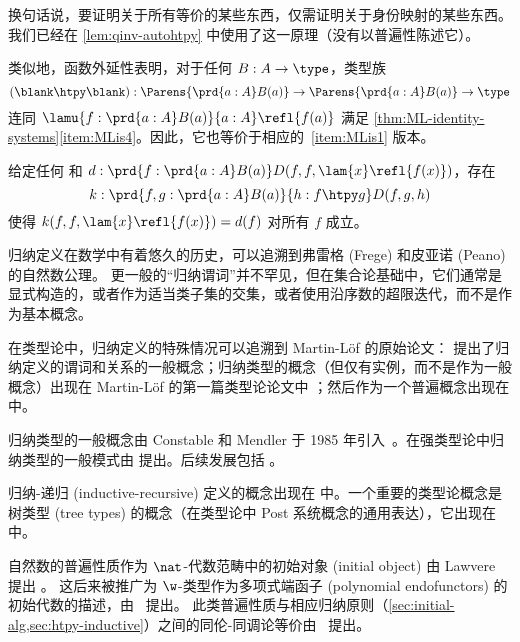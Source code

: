 换句话说，要证明关于所有等价的某些东西，仅需证明关于身份映射的某些东西。我们已经在 \cref{lem:qinv-autohtpy} 中使用了这一原理（没有以普遍性陈述它）。

类似地，函数外延性表明，对于任何 $B:A\to\type$，类型族
\[ (\blank\htpy\blank) : \Parens{\prd{a:A} B(a)} \to \Parens{\prd{a:A} B(a)} \to \type
\]
连同 $\lamu{f:\prd{a:A} B(a)}{a:A} \refl{f(a)}$ 满足 \cref{thm:ML-identity-systems}\ref{item:MLis4}。因此，它也等价于相应的~\ref{item:MLis1} 版本。

\begin{cor}\label{thm:htpy-induction}
%
%
给定任何  和 $d:\prd{f:\prd{a:A} B(a)} D(f,f,\lam{x}\refl{f(x)})$，存在
%
\begin{equation*}
    k:\prd{f,g:\prd{a:A} B(a)}{h:f\htpy g} D(f,g,h)
\end{equation*}
%
使得 $k(f,f,\lam{x}\refl{f(x)}) = d(f)$ 对所有 $f$ 成立。
\end{cor}

\sectionNotes

归纳定义在数学中有着悠久的历史，可以追溯到弗雷格 (Frege) 和皮亚诺 (Peano) 的自然数公理。 %
更一般的“归纳谓词”并不罕见，但在集合论基础中，它们通常是显式构造的，或者作为适当类子集的交集，或者使用沿序数的超限迭代，而不是作为基本概念。

在类型论中，归纳定义的特殊情况可以追溯到 Martin-Löf 的原始论文：\cite{martin-lof-hauptsatz} 提出了归纳定义的谓词和关系的一般概念；归纳类型的概念（但仅有实例，而不是作为一般概念）出现在 Martin-Löf 的第一篇类型论论文中 \cite{Martin-Lof-1973}；然后作为一个普遍概念出现在 \cite{Martin-Lof-1979} 中。%

归纳类型的一般概念由 Constable 和 Mendler 于 1985 年引入~\cite{DBLP:conf/lop/ConstableM85}。在强类型论中归纳类型的一般模式由 \cite{PfenningPaulinMohring} 提出。后续发展包括 \cite{CoquandPaulin, Dybjer:1991}。

归纳-递归 (inductive-recursive) 定义的概念出现在 \cite{Dybjer:2000} 中。一个重要的类型论概念是树类型 (tree types) 的概念（在类型论中 Post 系统概念的通用表达），它出现在 \cite{PeterssonSynek} 中。

自然数的普遍性质作为 $\nat$-代数范畴中的初始对象 (initial object) 由 Lawvere 提出 \cite{lawvere:adjinfound}。 这后来被推广为 $\w$-类型作为多项式端函子 (polynomial endofunctors) 的初始代数的描述，由~\cite{mp:wftrees} 提出。 此类普遍性质与相应归纳原则（\cref{sec:initial-alg,sec:htpy-inductive}）之间的同伦-同调论等价由~\cite{ags:it-hott} 提出。

